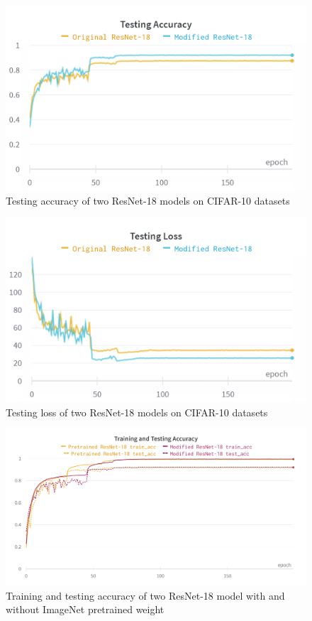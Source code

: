 \documentclass[twocolumn, draft]{extarticle}
\begin{document}
\begin{appendices}
\begin{figure}[H]
\centering
\includegraphics[width=0.9\linewidth]{charts/Section-2-Panel-2-qves7h50b}
\caption{Testing accuracy of two ResNet-18 models on CIFAR-10 datasets}
\label{chart: res_3}
\end{figure}

\begin{figure}[H]
\centering
\includegraphics[width=0.9\linewidth]{charts/Section-2-Panel-3-cw0a3tnrd}
\caption{Testing loss of two ResNet-18 models on CIFAR-10 datasets}
\label{chart: res_4}
\end{figure}

\begin{figure}[H]
\centering
\includegraphics[width=0.9\linewidth]{charts/resnet-18-cifar-10-pretrained-acc}
\caption{Training and testing accuracy of two ResNet-18 model with and without ImageNet pretrained weight}
\label{chart:resnet-18-cifar-10-pretrained-acc}
\end{figure}


\end{appendices}
\end{document}
